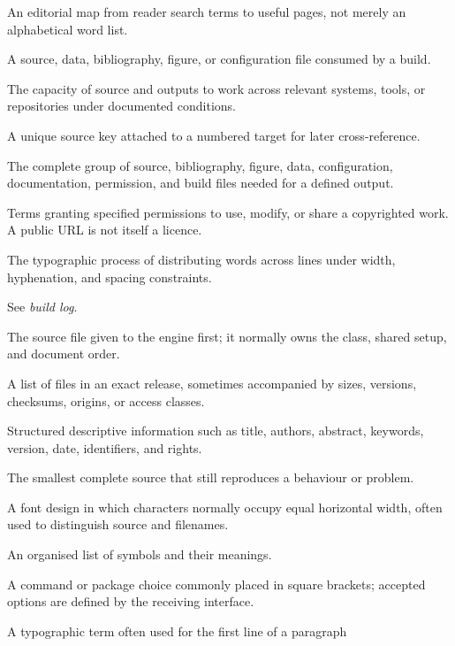 \begin{description}[style=nextline,leftmargin=1.6em,itemsep=0.75em]
  \item[Index] An editorial map from reader search terms to useful pages, not
        merely an alphabetical word list.
  \item[Input file] A source, data, bibliography, figure, or configuration file
        consumed by a build.
  \item[Interoperability] The capacity of source and outputs to work across
        relevant systems, tools, or repositories under documented conditions.
  \item[Label] A unique source key attached to a numbered target for later
        cross-reference.
  \item[\LaTeX{} project] The complete group of source, bibliography, figure, data,
        configuration, documentation, permission, and build files needed for a
        defined output.
  \item[Licence] Terms granting specified permissions to use, modify, or share a
        copyrighted work. A public URL is not itself a licence.
  \item[Line breaking] The typographic process of distributing words across
        lines under width, hyphenation, and spacing constraints.
  \item[Log] See \emph{build log}.
  \item[Main document] The source file given to the engine first; it normally
        owns the class, shared setup, and document order.
  \item[Manifest] A list of files in an exact release, sometimes accompanied by
        sizes, versions, checksums, origins, or access classes.
  \item[Metadata] Structured descriptive information such as title, authors,
        abstract, keywords, version, date, identifiers, and rights.
  \item[Minimal working example (MWE)] The smallest complete source that still
        reproduces a behaviour or problem.
  \item[Monospaced] A font design in which characters normally occupy equal
        horizontal width, often used to distinguish source and filenames.
  \item[Nomenclature] An organised list of symbols and their meanings.
  \item[Option] A command or package choice commonly placed in square brackets;
        accepted options are defined by the receiving interface.
  \item[Orphan] A typographic term often used for the first line of a paragraph

\end{description}
